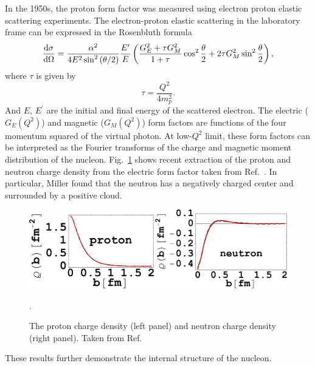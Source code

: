 In the 1950s, the proton form factor was measured using electron proton elastic
scattering experiments\cite{hofstadter1956}. The electron-proton elastic 
scattering in the laboratory frame can be expressed in the Rosenbluth formula
\begin{equation}
\dv{\sigma}{\Omega} = \frac{\alpha^2}{4E^2 \sin^2\left(\theta/2\right)} 
	\frac{E^\prime}{E} \left( \frac{G_E^2+\tau G_M^2}{1+\tau} \cos^2 
	\frac{\theta}{2} + 2\tau G_M^2 \sin^2 \frac{\theta}{2}\right)
	\label{eq:ep_cs},
\end{equation}
where $\tau$ is given by
\begin{equation}
\tau = \frac{Q^2}{4m_p^2}.
\end{equation}
And $E$, $E^\prime$ are the initial and final energy of the scattered electron.
The electric ($G_E\left(Q^2\right)$) and magnetic ($G_M\left(Q^2\right)$) form
factors are functions of the four momentum squared of the virtual photon. At 
low-$Q^2$ limit, these form factors can be interpreted as the Fourier transforms
of the charge and magnetic moment distribution of the nucleon. Fig.\ \ref{fig:charge}
shows recent extraction of the proton and neutron charge density from the electric
form factor taken from Ref.\ \cite{miller2007}. In particular, Miller found that
the neutron has a negatively charged center and surrounded by a positive cloud. 
\begin{figure}[htbp!]
    \centering
    \includegraphics[width=0.9\linewidth]{./images/charge_distribution_rotated}
    \caption{The proton charge density (left panel) and neutron charge density
	(right panel). Taken from Ref.\ \cite{miller2007}}.
    \label{fig:charge}
\end{figure}
These results further demonstrate the internal structure of the nucleon.

